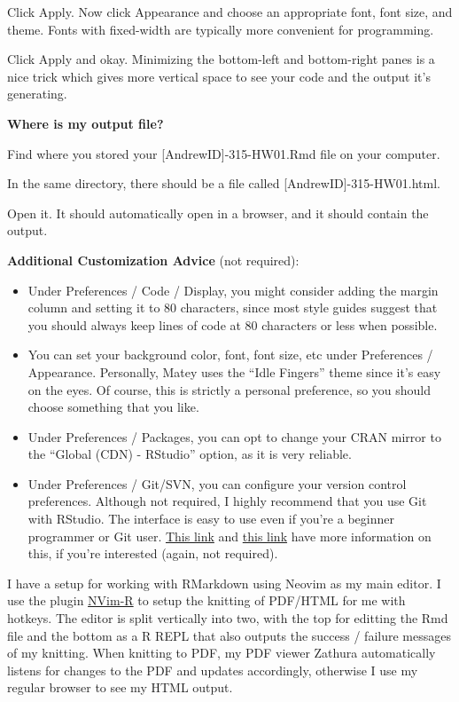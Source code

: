 \documentclass[]{article}
\providecommand{\tightlist}{%
  \setlength{\itemsep}{0pt}\setlength{\parskip}{0pt}}
\begin{document}
Click Apply. Now click Appearance and choose an appropriate font, font
size, and theme. Fonts with fixed-width are typically more convenient
for programming.

Click Apply and okay. Minimizing the bottom-left and bottom-right panes
is a nice trick which gives more vertical space to see your code and the
output it's generating.

\textbf{Where is my output file?}

Find where you stored your {[}AndrewID{]}-315-HW01.Rmd file on your
computer.

In the same directory, there should be a file called
{[}AndrewID{]}-315-HW01.html.

Open it. It should automatically open in a browser, and it should
contain the output.

\textbf{Additional Customization Advice} (not required):

\begin{itemize}
\tightlist
\item
  Under Preferences / Code / Display, you might consider adding the
  margin column and setting it to 80 characters, since most style guides
  suggest that you should always keep lines of code at 80 characters or
  less when possible.
\item
  You can set your background color, font, font size, etc under
  Preferences / Appearance. Personally, Matey uses the ``Idle Fingers''
  theme since it's easy on the eyes. Of course, this is strictly a
  personal preference, so you should choose something that you like.
\item
  Under Preferences / Packages, you can opt to change your CRAN mirror
  to the ``Global (CDN) - RStudio'' option, as it is very reliable.
\item
  Under Preferences / Git/SVN, you can configure your version control
  preferences. Although not required, I highly recommend that you use
  Git with RStudio. The interface is easy to use even if you're a
  beginner programmer or Git user.
  \href{https://support.rstudio.com/hc/en-us/articles/200532077-Version-Control-with-Git-and-SVN}{This
  link} and
  \href{https://jennybc.github.io/2014-05-12-ubc/ubc-r/session03_git.html}{this
  link} have more information on this, if you're interested (again, not
  required).
\end{itemize}

I have a setup for working with RMarkdown using Neovim as my main
editor. I use the plugin
\href{https://github.com/jalvesaq/Nvim-R}{NVim-R} to setup the knitting
of PDF/HTML for me with hotkeys. The editor is split vertically into
two, with the top for editting the Rmd file and the bottom as a R REPL
that also outputs the success / failure messages of my knitting. When
knitting to PDF, my PDF viewer Zathura automatically listens for changes
to the PDF and updates accordingly, otherwise I use my regular browser
to see my HTML output.
\end{document}
